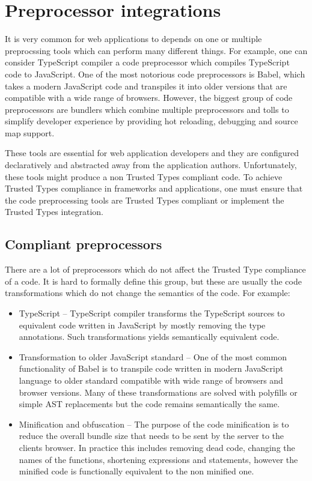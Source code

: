 \chapter{Preprocessor integrations}

It is very common for web applications to depends on one or multiple preprocssing tools which can
perform many different things. For example, one can consider TypeScript compiler a code preprocessor
which compiles TypeScript code to JavaScript. One of the most notorious code preprocessors is Babel,
which takes a modern JavaScript code and transpiles it into older versions that are compatible with
a wide range of browsers. However, the biggest group of code preprocessors are bundlers which
combine multiple preprocessors and tolls to simplify developer experience by providing hot
reloading, debugging and source map support.

These tools are essential for web application developers and they are configured declaratively and
abstracted away from the application authors. Unfortunately, these tools might produce a non Trusted
Types compliant code. To achieve Trusted Types compliance in frameworks and applications, one must
ensure that the code preprocessing tools are Trusted Types compliant or implement the Trusted Types
integration.

\section{Compliant preprocessors}

There are a lot of preprocessors which do not affect the Trusted Type compliance of a code. It is
hard to formally define this group, but these are usually the code transformations which do not
change the semantics of the code. For example:

\begin{itemize}
  \item TypeScript -- TypeScript compiler transforms the TypeScript sources to equivalent code
        written in JavaScript by mostly removing the type annotations. Such transformations yields
        semantically equivalent code.
  \item Transformation to older JavaScript standard -- One of the most common functionality of Babel
        is to transpile code written in modern JavaScript language to older standard compatible with
        wide range of browsers and browser versions. Many of these transformations are solved with
        polyfills or simple AST replacements but the code remains semantically the same.
  \item Minification and obfuscation -- The purpose of the code minification is to reduce the
        overall bundle size that needs to be sent by the server to the clients browser. In practice
        this includes removing dead code, changing the names of the functions, shortening
        expressions and statements, however the minified code is functionally equivalent to the non
        minified one.
\end{itemize}

